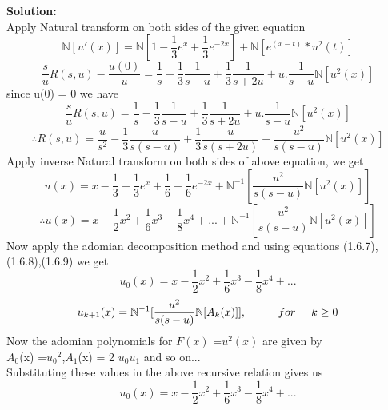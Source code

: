 \textbf{Solution:}\\
Apply Natural transform on both sides of the given equation 
\begin{equation*}
\mathbb{N}[u'(x)] = \mathbb{N}[1 - \frac{1}{3}e^{x} + \frac{1}{3}e^{-2x}] + \mathbb{N}[e^{(x-t)} * u^2(t)]
\end{equation*}
\begin{equation*}
\frac{s}{u}R(s,u) - \frac{u(0)}{u} = \frac{1}{s} - \frac{1}{3}\frac{1}{s-u} + \frac{1}{3}\frac{1}{s+2u} + u.\frac{1}{s-u}\mathbb{N}[u^2(x)]
\end{equation*}
since u(0) = 0 we have
\begin{equation*}
\frac{s}{u}R(s,u) = \frac{1}{s} - \frac{1}{3}\frac{1}{s-u} + \frac{1}{3}\frac{1}{s+2u} + u.\frac{1}{s-u}\mathbb{N}[u^2(x)]
\end{equation*}
\begin{equation}
\therefore R(s,u) = \frac{u}{s^2} - \frac{1}{3}\frac{u}{s(s-u)} + \frac{1}{3}\frac{u}{s(s+2u)} + \frac{u^2}{s(s-u)} \mathbb{N}[u^2(x)]
\end{equation}
Apply inverse Natural transform on both sides of above equation, we get
\begin{equation*}
u(x) = x - \frac{1}{3} - \frac{1}{3}e^{x} + \frac{1}{6} - \frac{1}{6}e^{-2x} + \mathbb{N}^{-1}[\frac{u^2}{s(s-u)} \mathbb{N}[u^2(x)]]
\end{equation*}
\begin{equation}
\therefore u(x) = x - \frac{1}{2}x^2 + \frac{1}{6}x^3 - \frac{1}{8}x^4 + ... + \mathbb{N}^{-1}[\frac{u^2}{s(s-u)}\mathbb{N}[u^2(x)]]
\end{equation}
Now apply the adomian decomposition method and using equations (1.6.7),(1.6.8),(1.6.9) we get
\begin{equation}
u_{0}(x) = x - \frac{1}{2}x^2 + \frac{1}{6}x^3 - \frac{1}{8}x^4 + ...
\end{equation}
\begin{equation}
  { u_{k+1}(x) = \mathbb{N}^{-1}[\frac{u^2}{s(s-u)}\mathbb{N}[A_{k}(x)]] ,  {\hspace{1 cm}}for  {\hspace{0.5cm}} k\geq 0}
   \end{equation}
Now the adomian polynomials for $ F(x)$ =$ u^2(x)$ are given by\\
$A_{0}$(x) =$ u_{0}$$^2$,$A_{1}$(x) = 2 $u_{0}$$u_{1}$  and so on...\\
Substituting these values in the above recursive relation  gives us
\begin{equation}
u_{0}(x) = x - \frac{1}{2}x^2 + \frac{1}{6}x^3 - \frac{1}{8}x^4 + ...   
\end{equation}
